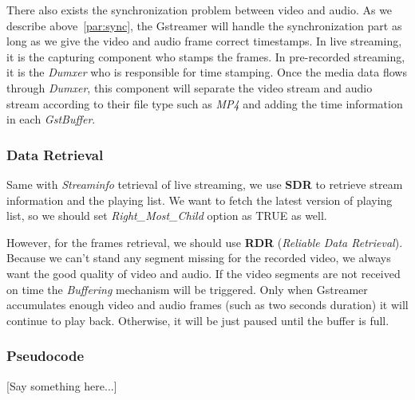 There also exists the synchronization problem between video and audio. As we describe above~\ref{par:sync}, the Gstreamer will handle the synchronization part as long as we give the video and audio frame correct timestamps. In live streaming, it is the capturing component who stamps the frames. In pre-recorded streaming, it is the \textit{Dumxer} who is responsible for time stamping. Once the media data flows through \textit{Dumxer}, this component will separate the video stream and audio stream according to their file type such as \textit{MP4} and adding the time information in each \textit{GstBuffer}.

\subsubsection{Data Retrieval}
Same with \textit{Streaminfo} tetrieval of live streaming, we use \textbf{SDR} to retrieve stream information and the playing list. We want to fetch the latest version of playing list, so we should set \textit{Right\_Most\_Child} option as TRUE as well.

However, for the frames retrieval, we should use \textbf{RDR} (\textit{Reliable Data Retrieval}). Because we can't stand any segment missing for the recorded video, we always want the good quality of video and audio. If the video segments are not received on time the \textit{Buffering} mechanism will be triggered. Only when Gstreamer accumulates enough video and audio frames (such as two seconds duration) it will continue to play back. Otherwise, it will be just paused until the buffer is full.

\subsubsection{Pseudocode}

[Say something here...]

